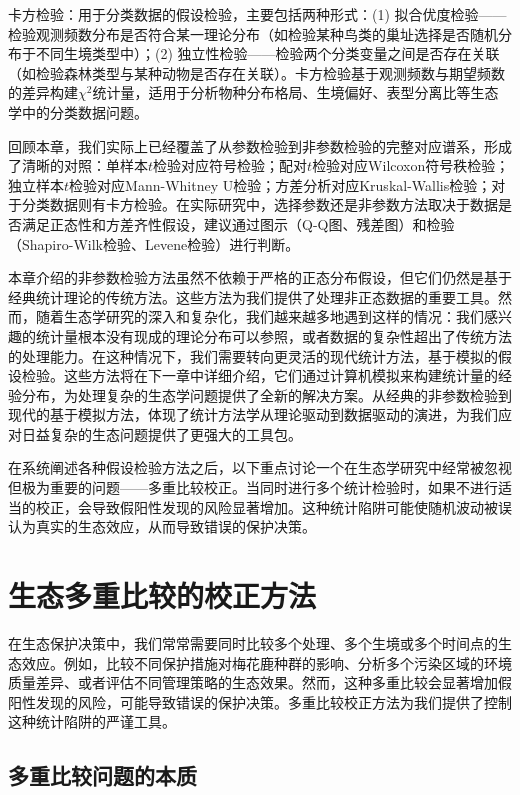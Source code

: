 \documentclass[
  twoside,12pt,fontset=none]{ctexbook}
\begin{document}
卡方检验：用于分类数据的假设检验，主要包括两种形式：(1) 拟合优度检验------检验观测频数分布是否符合某一理论分布（如检验某种鸟类的巢址选择是否随机分布于不同生境类型中）；(2) 独立性检验------检验两个分类变量之间是否存在关联（如检验森林类型与某种动物是否存在关联）。卡方检验基于观测频数与期望频数的差异构建\(\chi^2\)统计量，适用于分析物种分布格局、生境偏好、表型分离比等生态学中的分类数据问题。

回顾本章，我们实际上已经覆盖了从参数检验到非参数检验的完整对应谱系，形成了清晰的对照：单样本\(t\)检验对应符号检验；配对\(t\)检验对应Wilcoxon符号秩检验；独立样本\(t\)检验对应Mann-Whitney U检验；方差分析对应Kruskal-Wallis检验；对于分类数据则有卡方检验。在实际研究中，选择参数还是非参数方法取决于数据是否满足正态性和方差齐性假设，建议通过图示（Q-Q图、残差图）和检验（Shapiro-Wilk检验、Levene检验）进行判断。

本章介绍的非参数检验方法虽然不依赖于严格的正态分布假设，但它们仍然是基于经典统计理论的传统方法。这些方法为我们提供了处理非正态数据的重要工具。然而，随着生态学研究的深入和复杂化，我们越来越多地遇到这样的情况：我们感兴趣的统计量根本没有现成的理论分布可以参照，或者数据的复杂性超出了传统方法的处理能力。在这种情况下，我们需要转向更灵活的现代统计方法，基于模拟的假设检验。这些方法将在下一章中详细介绍，它们通过计算机模拟来构建统计量的经验分布，为处理复杂的生态学问题提供了全新的解决方案。从经典的非参数检验到现代的基于模拟方法，体现了统计方法学从理论驱动到数据驱动的演进，为我们应对日益复杂的生态问题提供了更强大的工具包。

在系统阐述各种假设检验方法之后，以下重点讨论一个在生态学研究中经常被忽视但极为重要的问题------多重比较校正。当同时进行多个统计检验时，如果不进行适当的校正，会导致假阳性发现的风险显著增加。这种统计陷阱可能使随机波动被误认为真实的生态效应，从而导致错误的保护决策。

\hypertarget{ux751fux6001ux591aux91cdux6bd4ux8f83ux7684ux6821ux6b63ux65b9ux6cd5}{%
\section{生态多重比较的校正方法}\label{ux751fux6001ux591aux91cdux6bd4ux8f83ux7684ux6821ux6b63ux65b9ux6cd5}}

在生态保护决策中，我们常常需要同时比较多个处理、多个生境或多个时间点的生态效应。例如，比较不同保护措施对梅花鹿种群的影响、分析多个污染区域的环境质量差异、或者评估不同管理策略的生态效果。然而，这种多重比较会显著增加假阳性发现的风险，可能导致错误的保护决策。多重比较校正方法为我们提供了控制这种统计陷阱的严谨工具。

\hypertarget{ux591aux91cdux6bd4ux8f83ux95eeux9898ux7684ux672cux8d28}{%
\subsection{多重比较问题的本质}\label{ux591aux91cdux6bd4ux8f83ux95eeux9898ux7684ux672cux8d28}}
\end{document}

